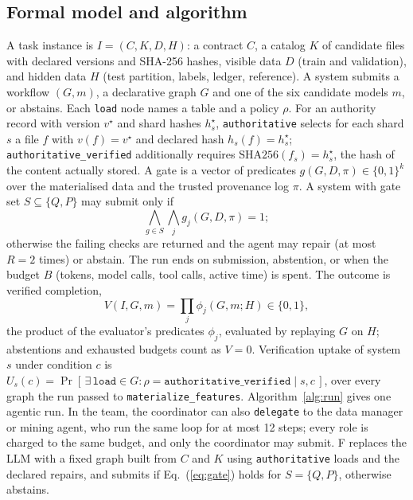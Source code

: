 \documentclass[conference]{IEEEtran}
\newcommand{\sys}[1]{\textsf{#1}}
\begin{document}
\subsection{Formal model and algorithm}
A task instance is $I=(C,K,D,H)$: a contract $C$, a catalog $K$ of candidate files with declared versions and SHA-256
hashes, visible data $D$ (train and validation), and hidden data $H$ (test partition, labels, ledger, reference). A
system submits a workflow $(G,m)$, a declarative graph $G$ and one of the six candidate models $m$, or abstains. Each
\texttt{load} node names a table and a policy $\rho$. For an authority record with version $v^\star$ and shard hashes
$h^\star_s$, \texttt{authoritative} selects for each shard $s$ a file $f$ with $v(f)=v^\star$ and declared hash
$h_s(f)=h^\star_s$; \texttt{authoritative\_verified} additionally requires $\mathrm{SHA256}(f_s)=h^\star_s$, the hash of
the content actually stored. A gate is a vector of predicates $g(G,D,\pi)\in\{0,1\}^{k}$ over the materialised data
and the trusted provenance log $\pi$. A system with gate set $S\subseteq\{Q,P\}$ may submit only if
\begin{equation}
\textstyle\bigwedge_{g\in S}\bigwedge_{j} g_j(G,D,\pi)=1;
\label{eq:gate}
\end{equation}
otherwise the failing checks are returned and the agent may repair (at most $R=2$ times) or abstain. The run ends on
submission, abstention, or when the budget $B$ (tokens, model calls, tool calls, active time) is spent. The outcome is
verified completion,
\begin{equation}
V(I,G,m)=\textstyle\prod_{j}\phi_j(G,m;H)\in\{0,1\},
\label{eq:v}
\end{equation}
the product of the evaluator's predicates $\phi_j$, evaluated by replaying $G$ on $H$; abstentions and exhausted
budgets count as $V=0$. Verification uptake of system $s$ under condition $c$ is
$U_s(c)=\Pr[\,\exists\,\texttt{load}\in G:\rho=\texttt{authoritative\_verified}\mid s,c\,]$, over every graph the run
passed to \texttt{materialize\_features}. Algorithm~\ref{alg:run} gives one agentic run. In the team, the coordinator
can also \texttt{delegate} to the data manager or mining agent, who run the same loop for at most 12 steps; every role
is charged to the same budget, and only the coordinator may submit. \sys{F} replaces the LLM with a fixed graph built
from $C$ and $K$ using \texttt{authoritative} loads and the declared repairs, and submits if Eq.~(\ref{eq:gate}) holds
for $S=\{Q,P\}$, otherwise abstains.
\end{document}
